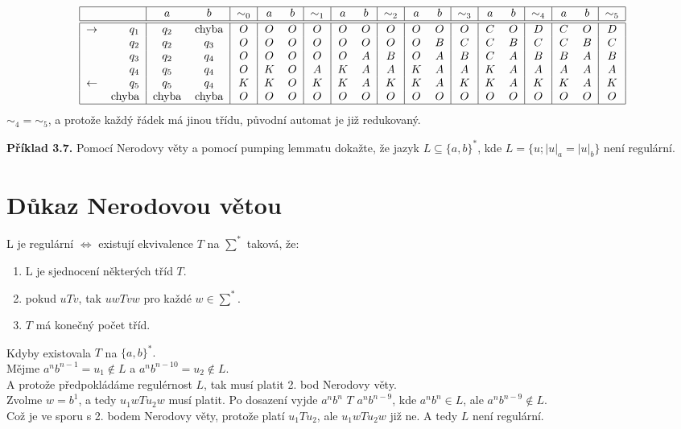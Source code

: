 \documentclass[11pt]{article}
\begin{document}
\[
\begin{tabular}{|r r|cc|c|cc|c|cc|c|cc|c|cc|c|cc|c|}
    \hline
    & & $a$ & $b$ & $\sim_0$ & $a$ & $b$ & $\sim_1$ & $a$ & $b$ & $\sim_2$ & $a$ & $b$ & $\sim_3$ & $a$ & $b$ & $\sim_4$ & $a$ & $b$ & $\sim_5$\\
    \hline
    \hline
    $\rightarrow$& $q_1$& $q_2$& chyba& $O$ & $O$ & $O$ & $O$ & $O$ & $O$ & $O$ & $O$ & $O$ & $O$ & $C$ & $O$ & $D$ & $C$ & $O$ & $D$\\
                 & $q_2$& $q_2$& $q_3$& $O$ & $O$ & $O$ & $O$ & $O$ & $O$ & $O$ & $O$ & $B$ & $C$ & $C$ & $B$ & $C$ & $C$ & $B$ & $C$\\
                 & $q_3$& $q_2$& $q_4$& $O$ & $O$ & $O$ & $O$ & $O$ & $A$ & $B$ & $O$ & $A$ & $B$ & $C$ & $A$ & $B$ & $B$ & $A$ & $B$\\
                 & $q_4$& $q_5$& $q_4$& $O$ & $K$ & $O$ & $A$ & $K$ & $A$ & $A$ & $K$ & $A$ & $A$ & $K$ & $A$ & $A$ & $A$ & $A$ & $A$\\
    $\leftarrow$ & $q_5$& $q_5$& $q_4$& $K$ & $K$ & $O$ & $K$ & $K$ & $A$ & $K$ & $K$ & $A$ & $K$ & $K$ & $A$ & $K$ & $K$ & $A$ & $K$\\
                 & chyba& chyba& chyba& $O$ & $O$ & $O$ & $O$ & $O$ & $O$ & $O$ & $O$ & $O$ & $O$ & $O$ & $O$ & $O$ & $O$ & $O$ & $O$\\ 
    \hline
\end{tabular}
\]
\noindent
$\sim_4 = \sim_5$, a protože každý řádek má jinou třídu, původní automat je již redukovaný.


\pagebreak 

\textbf{Příklad 3.7.} Pomocí Nerodovy věty a pomocí pumping lemmatu dokažte, že jazyk $L \subseteq \{a, b\}^*$, kde $L=\{u; |u|_a = |u|_b\}$ není regulární.

\section{Důkaz Nerodovou větou} 
L je regulární $\iff$ existují ekvivalence $T$ na $\sum^*$ taková, že:
\begin{enumerate}
    \item L je sjednocení některých tříd $T$.
    \item pokud $uTv$, tak $uwTvw$ pro každé $w \in \sum^*$.
    \item $T$ má konečný počet tříd.
\end{enumerate}
Kdyby existovala $T$ na $\{a, b\}^*.$\\
Mějme $a^n b^{n-1} = u_1 \not\in L$ a $a^n b^{n-10}= u_2 \not\in L$.\\
A protože předpokládáme regulérnost $L$, tak musí platit 2. bod Nerodovy věty.\\
Zvolme $w=b^1$, a tedy $u_1 w T u_2 w$ musí platit. Po dosazení vyjde $a^n b^n$ $T$ $a^n b^{n-9}$, kde $a^n b^n \in L$, ale $a^n b^{n-9} \not\in L$.\\
Což je ve sporu s 2. bodem Nerodovy věty, protože platí $u_1Tu_2$, ale $u_1 w T u_2 w$ již ne. A tedy $L$ není regulární.
\end{document}
